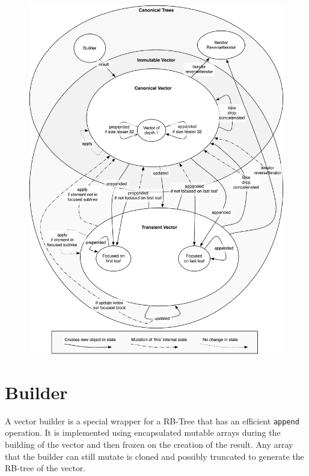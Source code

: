 \begin{figure}[h!]
  \centering
  \includegraphics[width=\textwidth]{Figures/StatesGraph}
  \caption{}
  \label{StatesGraphComplete}
\end{figure}

\clearpage
\section{Builder}
A vector builder is a special wrapper for a RB-Tree that has an efficient \texttt{append} operation. It is implemented using encapsulated mutable arrays during the building of the vector and then frozen on the creation of the result. Any array that the builder can still mutate is cloned and possibly truncated to generate the RB-tree of the vector. 


